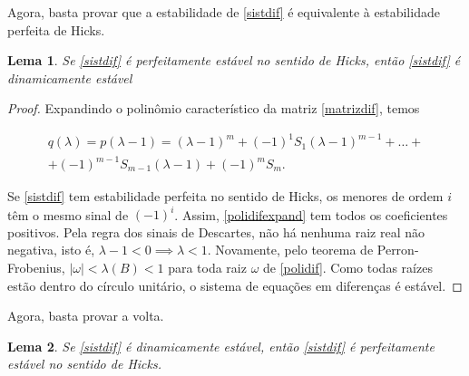 \documentclass[
	12pt,				%
	openright,			%
	twoside,			%
	a4paper,			%
	english,			%
	french,				%
	spanish,			%
	brazil				%
	]{abntex2}
\newtheorem{lema}{Lema}[chapter]
\begin{document}
Agora, basta provar que a estabilidade de \ref{sistdif} é equivalente à estabilidade
perfeita de Hicks.

\begin{lema}
	Se \ref{sistdif} é perfeitamente estável no sentido de Hicks, então
	\ref{sistdif} é dinamicamente estável
\end{lema}

\begin{proof}
Expandindo o polinômio característico da matriz \ref{matrizdif}, temos

\begin{equation} \label{polidifexpand}
	\begin{aligned}
	q(\lambda) = p(\lambda - 1) = (\lambda - 1)^m + (-1)^1 S_1(\lambda - 1)^{m-1} + \ldots + \\
	+ (-1)^{m-1}S_{m-1}(\lambda - 1) + (-1)^m S_m.
	\end{aligned}
\end{equation}

Se \ref{sistdif} tem estabilidade perfeita no sentido de Hicks, os menores de
ordem $i$ têm o mesmo sinal de $(-1)^i$. Assim, \ref{polidifexpand} tem todos os coeficientes
positivos. Pela regra dos sinais de Descartes, não há nenhuma raiz real não negativa,
isto é, $\lambda - 1 < 0 \implies \lambda < 1$. Novamente, pelo teorema
de Perron-Frobenius, $|\omega| < \lambda(B) < 1$ para toda raiz $\omega$ de
\ref{polidif}. Como todas raízes estão dentro do círculo unitário, o sistema de equações em diferenças
é estável.
\end{proof}

Agora, basta provar a volta.

\begin{lema}
	 Se \ref{sistdif} é dinamicamente estável, então
		\ref{sistdif} é perfeitamente estável no sentido de Hicks.
\end{lema}
\end{document}
